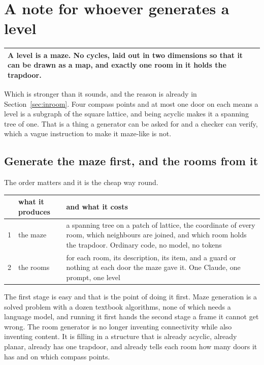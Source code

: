 \documentclass[11pt,a4paper]{article}
\begin{document}
\section{A note for whoever generates a level}
\label{sec:mazenote}

\begin{center}
\begin{tabular}{@{}>{\raggedright\arraybackslash}p{}@{}}
\toprule
\textbf{A level is a maze. No cycles, laid out in two dimensions so that it can be drawn as a map,
and exactly one room in it holds the trapdoor.} \\
\bottomrule
\end{tabular}
\end{center}

Which is stronger than it sounds, and the reason is already in Section~\ref{sec:inroom}. Four
compass points and at most one door on each means a level is a subgraph of the square lattice, and
being acyclic makes it a spanning tree of one. That is a thing a generator can be asked for and a
checker can verify, which a vague instruction to make it maze-like is not.

\subsection{Generate the maze first, and the rooms from it}

The order matters and it is the cheap way round.

\begin{center}
\begin{tabular}{@{}r@{\hspace{3mm}}l@{\hspace{3mm}}>{\raggedright\arraybackslash}p{}@{}}
\toprule
& \textbf{what it produces} & \textbf{and what it costs} \\
\midrule
1 & the maze & a spanning tree on a patch of lattice, the coordinate of every room, which
neighbours are joined, and which room holds the trapdoor. Ordinary code, no model, no tokens \\[1mm]
2 & the rooms & for each room, its description, its item, and a guard or nothing at each door the
maze gave it. One Claude, one prompt, one level \\
\bottomrule
\end{tabular}
\end{center}

\begin{sectionbox}
The first stage is easy and that is the point of doing it first. Maze generation is a solved
problem with a dozen textbook algorithms, none of which needs a language model, and running it
first hands the second stage a frame it cannot get wrong. The room generator is no longer inventing
connectivity while also inventing content. It is filling in a structure that is already acyclic,
already planar, already has one trapdoor, and already tells each room how many doors it has and on
which compass points.
\end{sectionbox}
\end{document}
